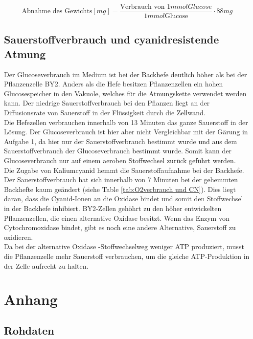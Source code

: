 \documentclass[10pt,a4paper]{article}
\begin{document}
	\begin{equation}\label{eq:Verbrauch}
			\text{Abnahme des Gewichts}  [mg] = \frac{\text{Verbrauch von } 1 mmol Glucose}{1 mmol \text{Glucose}} \cdot 88mg
	\end{equation}

		
	\subsection{Sauerstoffverbrauch und cyanidresistende Atmung}
	Der Glucoseverbrauch im Medium ist bei der Backhefe deutlich höher als bei der Pflanzenzelle BY2. Anders als die Hefe besitzen Pflanzenzellen ein hohen Glucosespeicher in den Vakuole, welches für die Atmungskette verwendet werden kann. Der niedrige Sauerstoffverbrauch bei den  Pflanzen liegt an der Diffusionsrate von Sauerstoff in der Flüssigkeit durch die Zellwand. \\
	Die Hefezellen verbrauchen innerhalb von 13 Minuten das ganze Sauerstoff in der Lösung. Der Glucoseverbrauch ist hier aber nicht Vergleichbar mit der Gärung in Aufgabe 1, da hier nur der Sauerstoffverbrauch bestimmt wurde und aus dem Sauerstoffverbrauch der Glucoseverbrauch bestimmt wurde. Somit kann der Glucoseverbrauch nur auf einem aeroben Stoffwechsel zurück geführt werden.\\
	Die Zugabe von Kaliumcyanid hemmt die Sauerstoffaufnahme bei der Backhefe. Der Sauerstoffverbrauch hat sich innerhalb von 7 Minuten bei der gehemmten Backhefte kaum geändert (siehe Table \ref{tab:O2verbrauch und CN}). Dies liegt daran, dass die Cyanid-Ionen an die Oxidase bindet und somit den Stoffwechsel in der Backhefe inhibiert. BY2-Zellen gehöhrt zu den höher entwickelten Pflanzenzellen, die einen alternative Oxidase besitzt. Wenn das Enzym von Cytochromoxidase bindet, gibt es noch eine andere Alternative, Sauerstoff zu oxidieren. \\
	Da bei der alternative Oxidase -Stoffwechselweg weniger ATP produziert, musst die Pflanzenzelle mehr Sauerstoff verbrauchen, um die gleiche ATP-Produktion in der Zelle aufrecht zu halten.\\
	
	\section{Anhang}
	\subsection{Rohdaten}
\end{document}
